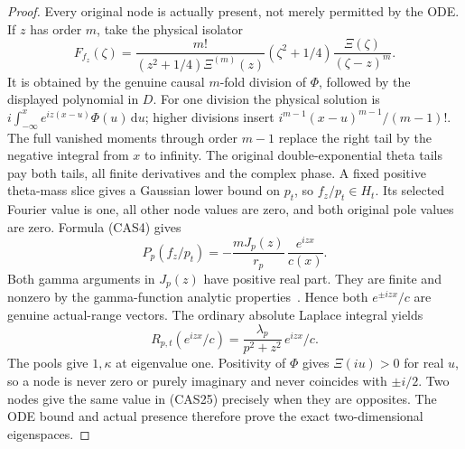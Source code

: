 \documentclass[11pt]{article}
\theoremstyle{remark}\newtheorem{remark}[theorem]{Remark}
\newcommand{\dd}{\,\mathrm d}
\begin{document}
\begin{proof}
Every original node is actually present, not merely permitted by
the ODE. If \(z\) has order \(m\), take the physical isolator
\[
 F_{f_z}(\zeta)=
 \frac{m!}{(z^2+1/4)\Xi^{(m)}(z)}
       (\zeta^2+1/4)\frac{\Xi(\zeta)}{(\zeta-z)^m}.      \tag{CAS23}
\]
It is obtained by the genuine causal \(m\)-fold division of
\(\Phi\), followed by the displayed polynomial in \(D\).
For one division the physical solution is
\(i\int_{-\infty}^x e^{iz(x-u)}\Phi(u)\dd u\); higher divisions
insert \(i^{m-1}(x-u)^{m-1}/(m-1)!\).
The full vanished moments through order \(m-1\) replace the right
tail by the negative integral from \(x\) to infinity. The original
double-exponential theta tails pay both tails, all finite
derivatives and the complex phase. A fixed positive theta-mass
slice gives a Gaussian lower bound on \(p_t\), so
\(f_z/p_t\in H_t\).
Its selected Fourier value is one, all other node values are zero,
and both original pole values are zero. Formula (CAS4) gives
\[
 P_p(f_z/p_t)=-\frac{mJ_p(z)}{r_p}\,\frac{e^{izx}}{c(x)}.\tag{CAS24}
\]
Both gamma arguments in \(J_p(z)\) have positive real part.
They are finite and nonzero by the gamma-function analytic
properties~\cite{DLMFGamma}. Hence both \(e^{\pm izx}/c\) are
genuine actual-range vectors. The ordinary absolute Laplace
integral yields
\[
 R_{p,t}(e^{izx}/c)=\frac{\lambda_p}{p^2+z^2}\,e^{izx}/c.\tag{CAS25}
\]
The pools give \(1,\kappa\) at eigenvalue one.
Positivity of \(\Phi\) gives \(\Xi(iu)>0\) for real \(u\), so a
node is never zero or purely imaginary and never coincides with
\(\pm i/2\). Two nodes give the same value in (CAS25) precisely
when they are opposites. The ODE bound and actual presence therefore
prove the exact two-dimensional eigenspaces.


\end{proof}
\end{document}
